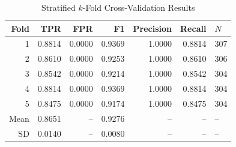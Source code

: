 \begin{table}[htbp]
\centering
\caption{Stratified $k$-Fold Cross-Validation Results}
\label{tab:crossval}
\begin{tabular}{rrrrrrl}
\toprule
Fold & TPR & FPR & F1 & Precision & Recall & $N$ \\
\midrule
  1 & 0.8814 & 0.0000 & 0.9369 & 1.0000 & 0.8814 & 307 \\
  2 & 0.8610 & 0.0000 & 0.9253 & 1.0000 & 0.8610 & 306 \\
  3 & 0.8542 & 0.0000 & 0.9214 & 1.0000 & 0.8542 & 304 \\
  4 & 0.8814 & 0.0000 & 0.9369 & 1.0000 & 0.8814 & 304 \\
  5 & 0.8475 & 0.0000 & 0.9174 & 1.0000 & 0.8475 & 304 \\
\midrule
  Mean & 0.8651 & -- & 0.9276 & -- & -- & -- \\
  SD & 0.0140 & -- & 0.0080 & -- & -- & -- \\
\bottomrule
\end{tabular}
\end{table}
